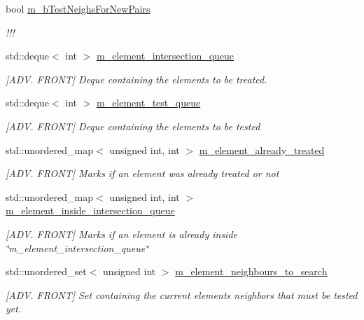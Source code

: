 \begin{DoxyCompactItemize}
bool \hyperlink{classcarl_1_1_patch__construction_a767adbbf39494b58d1f9d1dd65afce24}{m\+\_\+b\+Test\+Neighs\+For\+New\+Pairs}
\begin{DoxyCompactList}\small\item\em !!! \end{DoxyCompactList}\item 
std\+::deque$<$ int $>$ \hyperlink{classcarl_1_1_patch__construction_afb05a2bad18a8c6fa0287ae44a246687}{m\+\_\+element\+\_\+intersection\+\_\+queue}
\begin{DoxyCompactList}\small\item\em \mbox{[}A\+D\+V. F\+R\+O\+N\+T\mbox{]} Deque containing the elements to be treated. \end{DoxyCompactList}\item 
std\+::deque$<$ int $>$ \hyperlink{classcarl_1_1_patch__construction_a4afa35f6be957a083ac586ae158b55dc}{m\+\_\+element\+\_\+test\+\_\+queue}
\begin{DoxyCompactList}\small\item\em \mbox{[}A\+D\+V. F\+R\+O\+N\+T\mbox{]} Deque containing the elements to be tested \end{DoxyCompactList}\item 
std\+::unordered\+\_\+map$<$ unsigned int, int $>$ \hyperlink{classcarl_1_1_patch__construction_a11aed0d9b1e61d152d02cf56e1690c53}{m\+\_\+element\+\_\+already\+\_\+treated}
\begin{DoxyCompactList}\small\item\em \mbox{[}A\+D\+V. F\+R\+O\+N\+T\mbox{]} Marks if an element was already treated or not \end{DoxyCompactList}\item 
std\+::unordered\+\_\+map$<$ unsigned int, int $>$ \hyperlink{classcarl_1_1_patch__construction_a66d5ff525192d6aa53ea63beb95afd7d}{m\+\_\+element\+\_\+inside\+\_\+intersection\+\_\+queue}
\begin{DoxyCompactList}\small\item\em \mbox{[}A\+D\+V. F\+R\+O\+N\+T\mbox{]} Marks if an element is already inside \char`\"{}m\+\_\+element\+\_\+intersection\+\_\+queue\char`\"{} \end{DoxyCompactList}\item 
std\+::unordered\+\_\+set$<$ unsigned int $>$ \hyperlink{classcarl_1_1_patch__construction_a73186b0129fff50276de0c1eabd5ea0d}{m\+\_\+element\+\_\+neighbours\+\_\+to\+\_\+search}
\begin{DoxyCompactList}\small\item\em \mbox{[}A\+D\+V. F\+R\+O\+N\+T\mbox{]} Set containing the current element\textquotesingle{}s neighbors that must be tested yet. \end{DoxyCompactList}\item 

\end{DoxyCompactItemize}

